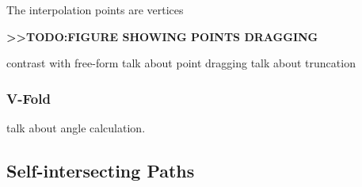 The interpolation points are vertices

\textbf{\textgreater{}\textgreater{}TODO:FIGURE SHOWING POINTS DRAGGING}

contrast with free-form talk about point dragging talk about truncation

\subsubsection{V-Fold}\label{v-fold}

talk about angle calculation.

\subsection{Self-intersecting Paths}\label{self-intersecting-paths}
